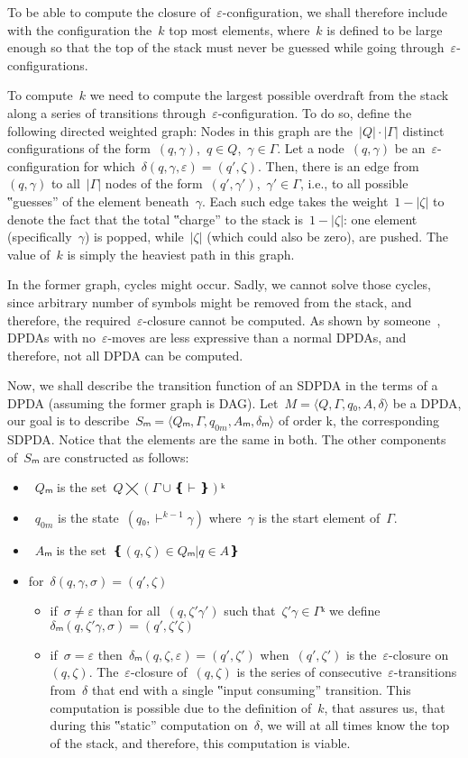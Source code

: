 To be able to compute the closure of~$ε$-configuration, we shall
  therefore include with the configuration the~$k$ top most elements,
  where~$k$ is defined to be large enough so that
  the top of the stack must never be guessed while going
  through~$ε$-configurations.

To compute~$k$ we need to compute the largest possible overdraft
  from the stack along a series of transitions through~$ε$-configuration.
To do so, define the following directed weighted graph:
Nodes in this graph are the~$|Q|·|Γ|$ distinct configurations
  of the form~$(q,γ)$,~$q∈Q$,~$γ∈Γ$.
Let a node~$(q,γ)$ be an~$ε$-configuration for which~$δ(q,γ,ε)=(q',ζ)$.
Then, there is an edge from~$(q,γ)$ to all~$|Γ|$ nodes of the form~$(q',γ')$,~$γ'∈Γ$, i.e.,
  to all possible ‟guesses” of the element beneath~$γ$.
Each such edge takes the weight~$1-|ζ|$ to denote the fact
  that the total ‟charge” to the stack is~$1-|ζ|$:
    one element (specifically~$γ$) is popped,
    while~$|ζ|$ (which could also be zero), are pushed.
The value of~$k$ is simply the heaviest path in this graph.

In the former graph, cycles might occur.
Sadly, we cannot solve those cycles, since arbitrary number of symbols might be removed from the
  stack, and therefore, the required~$ε$-closure cannot be computed.
As shown by someone~\cite{i:need:to::find:it}, DPDAs with no~$ε$-moves are less expressive than a normal DPDAs,
  and therefore, not all DPDA can be computed.

Now, we shall describe the transition function of an SDPDA in the terms of a DPDA (assuming the former graph is DAG).
Let~$M=⟨Q,Γ,q₀,A,δ⟩$ be a DPDA, our goal is to describe~$Sₘ=⟨Qₘ,Γ,q_{0m},Aₘ,δₘ⟩$
  of order k, the corresponding SDPDA\@.
Notice that the elements are the same in both.
The other components of~$Sₘ$ are constructed as follows:
\begin{itemize}
 \item~$Qₘ$ is the set~$Q⨉\left(Γ∪❴\vdash❵\right)ᵏ$
 \item~$q_{0m}$ is the state~$(q₀,\vdash^{k-1}γ)$ where~$γ$ is the start element of~$Γ$.
 \item~$Aₘ$ is the set~$❴(q,ζ)∈Qₘ | q∈A❵$
 \item for~$δ(q,γ,σ) = (q',ζ)$
 \begin{itemize}
  \item if~$σ≠ε$ than for all~$(q,ζ'γ')$ such that~$ζ'γ∈Γᵏ$
    we define~$δₘ(q,ζ'γ,σ)=(q',ζ'ζ)$
  \item if~$σ=ε$ then~$δₘ(q,ζ,ε)=(q',ζ')$ when~$(q',ζ')$
    is the~$ε$-closure on~$(q,ζ)$.
    The~$ε$-closure of~$(q,ζ)$ is the series of consecutive~$ε$-transitions from~$δ$
    that end with a single ‟input consuming” transition.
    This computation is possible due to the definition of~$k$, that assures us, that during this ‟static”
    computation on~$δ$, we will at all times know the top of the stack, and therefore, this computation
    is viable.
 \end{itemize}

\end{itemize}

